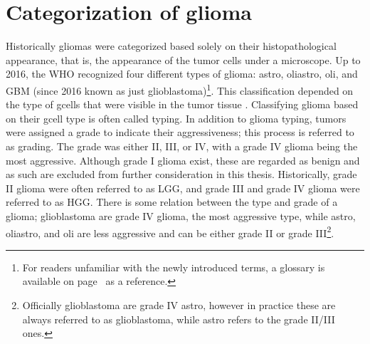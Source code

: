 \section{Categorization of glioma}
Historically \glspl{glioma} were categorized based solely on their histopathological appearance, that is, the appearance of the \gls{tumor} cells under a microscope.
Up to 2016, the \gls{WHO} recognized four different types of \gls{glioma}: \gls{astro}, \gls{oliastro}, \gls{oli}, and \gls{GBM} (since 2016 known as just \gls{glioblastoma})\footnote{For readers unfamiliar with the newly introduced terms, a glossary is available on page~\pageref{glossary} as a reference.}.
This classification depended on the type of \glspl{gcell} that were visible in the \gls{tumor} tissue \autocite{louis2007who}.
Classifying \gls{glioma} based on their \gls{gcell} type is often called typing.
In addition to \gls{glioma} typing, \glspl{tumor} were assigned a grade to indicate their aggressiveness; this process is referred to as grading.
The grade was either II, III, or IV, with a grade IV \gls{glioma} being the most aggressive.
Although grade I \gls{glioma} exist, these are regarded as benign and as such are excluded from further consideration in this thesis.
Historically, grade II \gls{glioma} were often referred to as \gls{LGG}, and grade III and grade IV \gls{glioma} were referred to as \gls{HGG}.
There is some relation between the type and grade of a glioma; \gls{glioblastoma} are grade IV glioma, the most aggressive type, while \gls{astro}, \gls{oliastro}, and \gls{oli} are less aggressive and can be either grade II or grade III\footnote{Officially \gls{glioblastoma} are grade IV \gls{astro}, however in practice these are always referred to as \gls{glioblastoma}, while \gls{astro} refers to the grade II/III ones.}.


